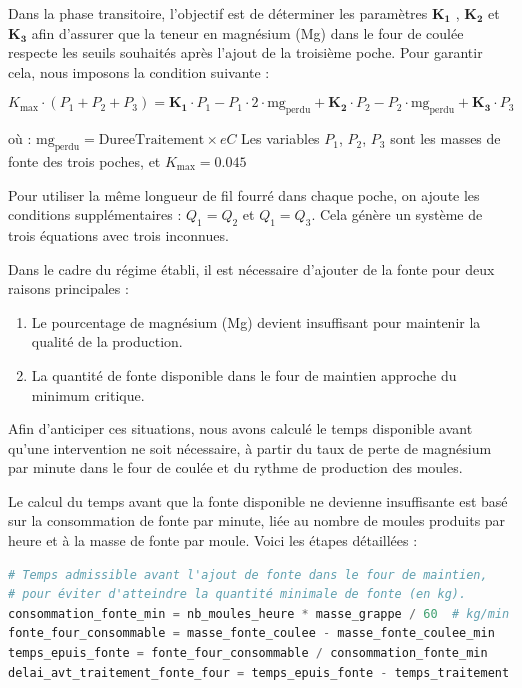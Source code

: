 \documentclass[12pt]{article}
\begin{document}
Dans la phase transitoire, l'objectif est de déterminer les 
paramètres $\mathbf{K_1}$ , $\mathbf{K_2}$ et $\mathbf{K_3}$ afin d'assurer 
que la teneur en magnésium (Mg) dans le four de coulée respecte les 
seuils souhaités après l'ajout de la troisième poche. Pour garantir 
cela, nous imposons la condition suivante :

$$
K_{\text{max}} \cdot (P_1 + P_2 + P_3) = \mathbf{K_1} \cdot P_1 - P_1 \cdot 2 \cdot \text{mg}_{\text{perdu}} + \mathbf{K_2}  \cdot P_2 - P_2 \cdot \text{mg}_{\text{perdu}} + \mathbf{K_3}  \cdot P_3
$$

où :
$\text{mg}_{\text{perdu}} = \text{DureeTraitement} \times eC$
Les variables $P_1$, $P_2$, $P_3$ sont les masses de fonte des trois 
poches, et $K_{\text{max}} = 0.045$

Pour utiliser la même longueur de fil fourré dans chaque 
poche, on ajoute les conditions supplémentaires : $Q_1 = Q_2$ 
et $Q_1 = Q_3$. Cela génère un système de trois équations avec trois 
inconnues.



Dans le cadre du régime établi, il est nécessaire d'ajouter de la fonte 
pour deux raisons principales :
\begin{enumerate}
    \item Le pourcentage de magnésium (Mg) devient insuffisant pour maintenir la qualité de la production.
    \item La quantité de fonte disponible dans le four de maintien approche du minimum critique.
\end{enumerate}

Afin d'anticiper ces situations, nous avons calculé le temps disponible 
avant qu'une intervention ne soit nécessaire, à partir du taux de perte 
de magnésium par minute dans le four de coulée et du rythme de production 
des moules.



Le calcul du temps avant que la fonte disponible ne devienne insuffisante 
est basé sur la consommation de fonte par minute, liée au nombre de moules 
produits par heure et à la masse de fonte par moule. Voici les étapes 
détaillées :

\begin{lstlisting}[language=Python, caption=Calcul du temps avant épuisement de la fonte]
# Temps admissible avant l'ajout de fonte dans le four de maintien,
# pour éviter d'atteindre la quantité minimale de fonte (en kg).
consommation_fonte_min = nb_moules_heure * masse_grappe / 60  # kg/min
fonte_four_consommable = masse_fonte_coulee - masse_fonte_coulee_min
temps_epuis_fonte = fonte_four_consommable / consommation_fonte_min
delai_avt_traitement_fonte_four = temps_epuis_fonte - temps_traitement
\end{lstlisting}
\end{document}
